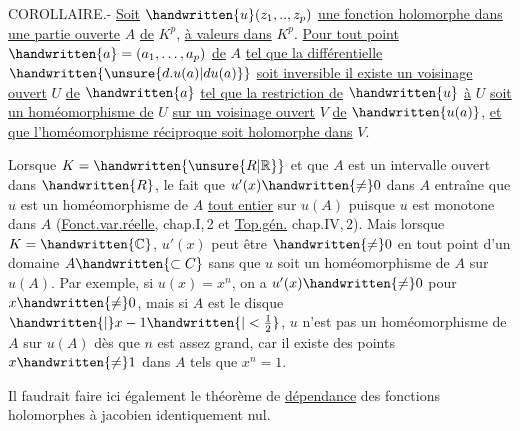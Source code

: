 
COROLLAIRE.- \uline{Soit} $\handwritten{u}(z_1,..,z_p)$ \uline{une fonction holomorphe dans une partie ouverte} $A$ \uline{de} $K^p$, \uline{à valeurs dans} $K^p$. \uline{Pour tout point} $\handwritten{a}=(a_1,\ldots,a_p)$ \uline{de} $A$ \uline{tel que la différentielle} $\handwritten{\unsure{d.u(a)|du(a)}}$ \uline{soit inversible il existe un voisinage ouvert} $U$ \uline{de} $\handwritten{a}$ \uline{tel que la restriction de} $\handwritten{u}$ \uline{à} $U$ \uline{soit un homéomorphisme de} $U$ \uline{sur un voisinage ouvert} $V$ \uline{de} $\handwritten{u(a)}$, \uline{et que l'homéomorphisme réciproque soit holomorphe dans} $V$.

Lorsque $K=\handwritten{\unsure{R|\mathbb{R}}}$ et que $A$ est un intervalle ouvert dans $\handwritten{R}$, le fait que $u'(x)\handwritten{\ne}0$ dans $A$ entraîne que $u$ est un homéomorphisme de $A$ \uline{tout entier} sur $u(A)$ puisque $u$ est monotone dans $A$ (\uline{Fonct.var.réelle}, chap.I,\handwritten{\S}\,2 et \uline{Top.gén.} chap.IV,\handwritten{\S}\,2). Mais lorsque $K=\handwritten{\mathbb{C}}$, $u'(x)$ peut être $\handwritten{\ne}0$ en tout point d'un domaine $A\handwritten{\subset C}$ sans que $u$ soit un homéomorphisme de $A$ sur $u(A)$. Par exemple, si $u(x)=x^n$, on a $u'(x)\handwritten{\ne}0$ pour $x\handwritten{\ne}0$, mais si $A$ est le disque $\handwritten{|}x-1\handwritten{|<\frac{1}{2}}$, $u$ n'est pas un homéomorphisme de $A$ sur $u(A)$ dès que $n$ est assez grand, car il existe des points $x\handwritten{\ne}1$ dans $A$ tels que $x^n=1$.

Il faudrait faire ici également le théorème de \uline{dépendance} des fonctions holomorphes à jacobien identiquement nul.

